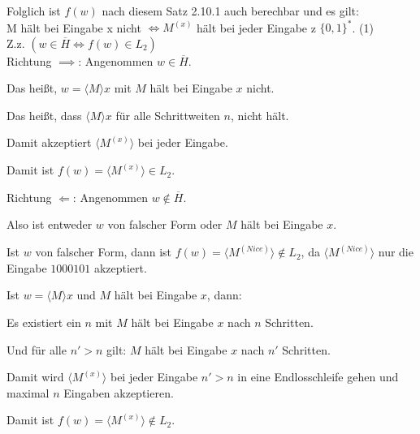 \documentclass[a4paper,12pt]{article}
\begin{document}
Folglich ist $f(w)$ nach diesem Satz 2.10.1 auch berechbar und es gilt: \\
M hält bei Eingabe x nicht $\iff M^{(x)}$ hält bei jeder Eingabe z $\{0,1\}^*$. (1) \\
Z.z. $(w \in \overline{H} \iff f(w) \in L_2)$ \\

Richtung $\implies$: Angenommen $w \in \overline{H}$.

Das heißt, $w=\langle M\rangle x$ mit $M$ hält bei Eingabe $x$ nicht.

Das heißt, dass $\langle M\rangle x$ für alle Schrittweiten $n$, nicht hält.

Damit akzeptiert $\langle M^{(x)}\rangle$ bei jeder Eingabe.

Damit ist $f(w)=\langle M^{(x)}\rangle \in L_2$.

Richtung $\Leftarrow$: Angenommen $w \notin \overline{H}$.

Also ist entweder $w$ von falscher Form oder $M$ hält bei Eingabe $x$.

Ist $w$ von falscher Form, dann ist $f(w)=\langle M^{(Nice)} \rangle \notin L_2$, da $\langle M^{(Nice)} \rangle$ nur die Eingabe $1000101$ akzeptiert.

Ist $w=\langle M\rangle x$ und $M$ hält bei Eingabe $x$, dann:

Es existiert ein $n$ mit $M$ hält bei Eingabe $x$ nach $n$ Schritten.

Und für alle $n'>n$ gilt: $M$ hält bei Eingabe $x$ nach $n'$ Schritten.

Damit wird $\langle M^{(x)}\rangle$ bei jeder Eingabe $n'>n$ in eine Endlosschleife gehen und maximal $n$ Eingaben akzeptieren.

Damit ist $f(w)=\langle M^{(x)}\rangle \notin L_2$.
\end{document}
